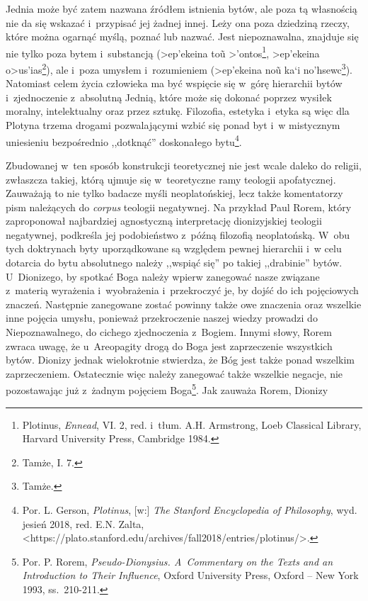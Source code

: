 Jednia może być zatem nazwana źródłem istnienia bytów, ale poza tą własnością nie da się wskazać i~przypisać jej żadnej innej. Leży ona poza dziedziną rzeczy, które można ogarnąć myślą, poznać lub nazwać. Jest niepoznawalna, znajduje się nie tylko poza bytem i~substancją (\textgreek{>ep'ekeina to\~u >'ontos}\footnote{Plotinus, \textit{Ennead}, VI. 2, red. i~tłum. A.H. Armstrong, Loeb Classical Library, Harvard University Press, Cambridge 1984.}, \textgreek{>ep'ekeina o>us'ias}\footnote{Tamże, I. 7.}), ale i~poza umysłem i~rozumieniem (\textgreek{>ep'ekeina no\~u  ka`i no'hsewc}\footnote{Tamże.}). Natomiast celem życia człowieka ma być wspięcie się w~górę hierarchii bytów i~zjednoczenie z~absolutną Jednią, które może się dokonać poprzez wysiłek moralny, intelektualny oraz przez sztukę. Filozofia, estetyka i~etyka są więc dla Plotyna trzema drogami pozwalającymi wzbić się ponad byt i~w mistycznym uniesieniu bezpośrednio ,,dotknąć'' doskonałego bytu\footnote{Por. L. Gerson, \textit{Plotinus}, [w:] \textit{The Stanford Encyclopedia of Philosophy}, wyd. jesień 2018, red. E.N. Zalta, {\textless}https://plato.stanford.edu/archives/fall2018/entries/plotinus/{\textgreater}.}.

Zbudowanej w~ten sposób konstrukcji teoretycznej nie jest wcale daleko do religii, zwłaszcza takiej, którą ujmuje się w~teoretyczne ramy teologii apofatycznej. Zauważają to nie tylko badacze myśli neoplatońskiej, lecz także komentatorzy pism należących do \textit{corpus} teologii negatywnej. Na przykład Paul Rorem, który zaproponował najbardziej agnostyczną interpretację dionizyjskiej teologii negatywnej, podkreśla jej podobieństwo z~późną filozofią neoplatońską. W~obu tych doktrynach byty uporządkowane są względem pewnej hierarchii i~w celu dotarcia do bytu absolutnego należy ,,wspiąć się'' po takiej ,,drabinie'' bytów. U~Dionizego, by spotkać Boga należy wpierw zanegować nasze związane z~materią wyrażenia i~wyobrażenia i~przekroczyć je, by dojść do ich pojęciowych znaczeń. Następnie zanegowane zostać powinny także owe znaczenia oraz wszelkie inne pojęcia umysłu, ponieważ przekroczenie naszej wiedzy prowadzi do Niepoznawalnego, do cichego zjednoczenia z~Bogiem. Innymi słowy, Rorem zwraca uwagę, że u~Areopagity drogą do Boga jest zaprzeczenie wszystkich bytów. Dionizy jednak wielokrotnie stwierdza, że Bóg jest także ponad wszelkim zaprzeczeniem. Ostatecznie więc należy zanegować także wszelkie negacje, nie pozostawając już z~żadnym pojęciem Boga\footnote{Por. P. Rorem, \textit{Pseudo-Dionysius. A~Commentary on the Texts and an Introduction to Their Influence}, Oxford University Press, Oxford -- New York 1993, ss.~210-211.}. Jak zauważa Rorem, Dionizy

